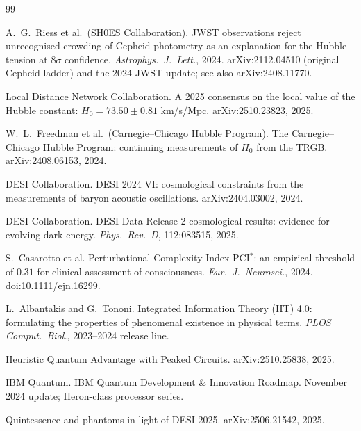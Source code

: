 \documentclass[11pt,a4paper]{article}
\theoremstyle{definition}
\theoremstyle{remark}
\begin{document}
\begin{thebibliography}{99}

A.\ G.\ Riess et al.\ (SH0ES Collaboration).
\newblock JWST observations reject unrecognised crowding of Cepheid
photometry as an explanation for the Hubble tension at
$8\sigma$ confidence.
\newblock \emph{Astrophys.\ J.\ Lett.}, 2024.
\newblock arXiv:2112.04510 (original Cepheid ladder) and the
2024 JWST update; see also arXiv:2408.11770.

Local Distance Network Collaboration.
\newblock A 2025 consensus on the local value of the Hubble
constant: $H_{0} = 73.50 \pm 0.81$ km/s/Mpc.
\newblock arXiv:2510.23823, 2025.

W.\ L.\ Freedman et al.\ (Carnegie--Chicago Hubble Program).
\newblock The Carnegie--Chicago Hubble Program: continuing measurements
of $H_{0}$ from the TRGB.
\newblock arXiv:2408.06153, 2024.

DESI Collaboration.
\newblock DESI 2024 VI: cosmological constraints from the measurements
of baryon acoustic oscillations.
\newblock arXiv:2404.03002, 2024.

DESI Collaboration.
\newblock DESI Data Release 2 cosmological results: evidence for
evolving dark energy.
\newblock \emph{Phys.\ Rev.\ D}, 112:083515, 2025.

S.\ Casarotto et al.
\newblock Perturbational Complexity Index PCI$^{*}$: an empirical
threshold of $0.31$ for clinical assessment of consciousness.
\newblock \emph{Eur.\ J.\ Neurosci.}, 2024.
\newblock doi:10.1111/ejn.16299.

L.\ Albantakis and G.\ Tononi.
\newblock Integrated Information Theory (IIT) 4.0: formulating
the properties of phenomenal existence in physical terms.
\newblock \emph{PLOS Comput.\ Biol.}, 2023--2024 release line.

Heuristic Quantum Advantage with Peaked Circuits.
\newblock arXiv:2510.25838, 2025.

IBM Quantum.
\newblock IBM Quantum Development \& Innovation Roadmap.
\newblock November 2024 update; Heron-class processor series.

Quintessence and phantoms in light of DESI 2025.
\newblock arXiv:2506.21542, 2025.


\end{thebibliography}
\end{document}
